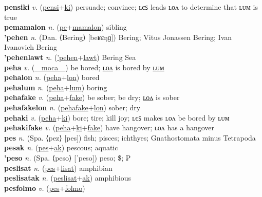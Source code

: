 \textbf{pensiki} \textit{v.} (\hyperref[pensi]{pensi}+\hyperref[ki]{ki})
persuade; convince; ʟєꜱ leads ʟᴏᴧ to determine that ʟᴜᴍ is true \label{pensiki} \\
\textbf{pemamalon} \textit{n.} (\hyperref[pe]{pe}+\hyperref[mamalon]{mamalon})
sibling \label{pemamalon} \\
\textbf{'pehen} \textit{n.} (Dan. ⟨Bering⟩ [beʁɛŋɡ])
Bering; Vitus Jonassen Bering; Ivan Ivanovich Bering \label{'pehen} \\
\textbf{'pehenlawt} \textit{n.} (\hyperref['pehen]{'pehen}+\hyperref[lawt]{lawt})
Bering Sea \label{'pehenlawt} \\
\textbf{peha} \textit{v.} (\hyperref[moca]{~~moca~~})
be bored; \hyperref[pehalon]{ʟᴏᴧ} is bored by \hyperref[pehalum]{ʟᴜᴍ} \label{peha} \\
\textbf{pehalon} \textit{n.} (\hyperref[peha]{peha}+\hyperref[lon]{lon})
bored \label{pehalon} \\
\textbf{pehalum} \textit{n.} (\hyperref[peha]{peha}+\hyperref[lum]{lum})
boring \label{pehalum} \\
\textbf{pehafake} \textit{v.} (\hyperref[peha]{peha}+\hyperref[fake]{fake})
be sober; be dry; \hyperref[pehafakelon]{ʟᴏᴧ} is sober \label{pehafake} \\
\textbf{pehafakelon} \textit{n.} (\hyperref[pehafake]{pehafake}+\hyperref[lon]{lon})
sober; dry \label{pehafakelon} \\
\textbf{pehaki} \textit{v.} (\hyperref[peha]{peha}+\hyperref[ki]{ki})
bore; tire; kill joy; ʟєꜱ makes ʟᴏᴧ be bored by ʟᴜᴍ \label{pehaki} \\
\textbf{pehakifake} \textit{v.} (\hyperref[peha]{peha}+\hyperref[ki]{ki}+\hyperref[fake]{fake})
have hangover; ʟᴏᴧ has a hangover \label{pehakifake} \\
\textbf{pes} \textit{n.} (Spa. ⟨pez⟩ [pes])
fish; pisces; ichthyes; Gnathostomata minus Tetrapoda \label{pes} \\
\textbf{pesak} \textit{n.} (\hyperref[pes]{pes}+\hyperref[ak]{ak})
pescous; aquatic \label{pesak} \\
\textbf{'peso} \textit{n.} (Spa. ⟨peso⟩ [ˈpeso])
peso; \$; ₱ \label{'peso} \\
\textbf{peslisat} \textit{n.} (\hyperref[pes]{pes}+\hyperref[lisat]{lisat})
amphibian \label{peslisat} \\
\textbf{peslisatak} \textit{n.} (\hyperref[peslisat]{peslisat}+\hyperref[ak]{ak})
amphibious \label{peslisatak} \\
\textbf{pesfolmo} \textit{v.} (\hyperref[pes]{pes}+\hyperref[folmo]{folmo})

